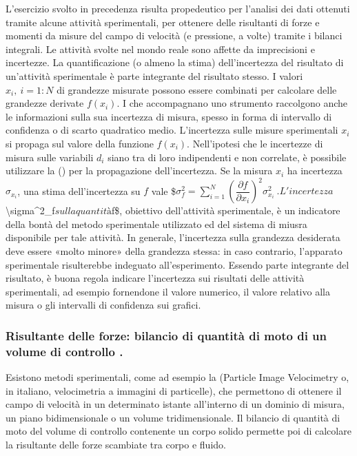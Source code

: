\documentclass[letterpaper,10pt,italian]{jupyterBook}
\begin{document}
\sphinxAtStartPar
L’esercizio svolto in precedenza risulta propedeutico per l’analisi dei
dati ottenuti tramite alcune attività sperimentali, per ottenere delle
risultanti di forze e momenti da misure del campo di velocità (e
pressione, a volte) tramite i bilanci integrali. Le attività svolte nel
mondo reale sono affette da imprecisioni e incertezze. La
quantificazione (o almeno la stima) dell’incertezza del risultato di
un’attività sperimentale è parte integrante del risultato stesso. I
valori \(x_i, \ i=1:N\) di grandezze misurate possono essere combinati per
calcolare delle grandezze derivate \(f(x_i)\). I  che
accompagnano uno strumento raccolgono anche le informazioni sulla sua
incertezza di misura, spesso in forma di intervallo di confidenza o di
scarto quadratico medio. L’incertezza sulle misure sperimentali \(x_i\) si
propaga sul valore della funzione \(f(x_i)\). Nell’ipotesi che le
incertezze di misura sulle variabili \(d_i\) siano tra di loro
indipendenti e non correlate, è possibile utilizzare la 
() per la propagazione dell’incertezza. Se la misura
\(x_i\) ha incertezza \(\sigma_{x_i}\), una stima dell’incertezza su \(f\)
vale
\$\(\sigma_f^2 = \sum_{i=1}^{N} \left( \dfrac{\partial f}{\partial x_i} \right)^2 \sigma_{x_i}^2 \ .\)\(
L'incertezza \)\textbackslash{}sigma\textasciicircum{}2\_f\( sulla quantità \)f\$, obiettivo dell’attività
sperimentale, è un indicatore della bontà del metodo sperimentale
utilizzato ed del sistema di miusra disponibile per tale attività. In
generale, l’incertezza sulla grandezza desiderata deve essere «molto
minore» della grandezza stessa: in caso contrario, l’apparato
sperimentale risulterebbe indeguato all’esperimento. Essendo parte
integrante del risultato, è buona regola indicare l’incertezza sui
risultati delle attività sperimentali, ad esempio fornendone il valore
numerico, il valore relativo alla misura o gli intervalli di confidenza
sui grafici.


\subsubsection{Risultante delle forze: bilancio di quantità di moto di un volume di controllo .}
\label{\detokenize{polimi/fluidmechanics-ita/template/capitoli/04_bilanci/0401SciaExp:risultante-delle-forze-bilancio-di-quantita-di-moto-di-un-volume-di-controllo}}
\sphinxAtStartPar
Esistono metodi sperimentali, come ad esempio la  (Particle Image
Velocimetry o, in italiano, velocimetria a immagini di particelle), che
permettono di ottenere il campo di velocità in un determinato istante
all’interno di un dominio di misura, un piano bidimensionale o un volume
tridimensionale. Il bilancio di quantità di moto del volume di controllo
contenente un corpo solido permette poi di calcolare la risultante delle
forze scambiate tra corpo e fluido.
\end{document}
